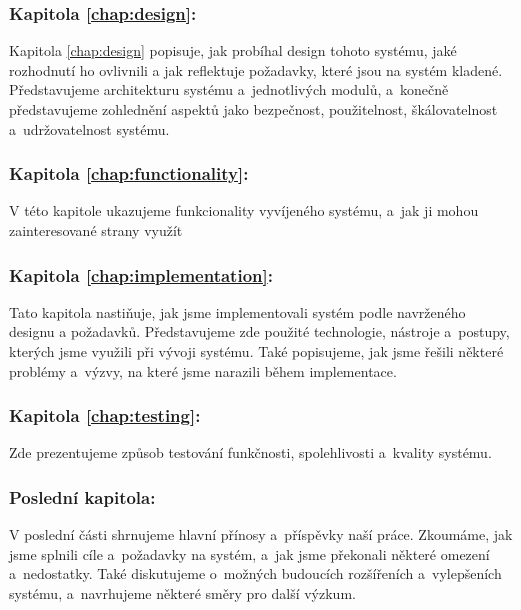 \subsubsection{Kapitola \ref{chap:design}: }
Kapitola \ref{chap:design} popisuje, jak probíhal design tohoto systému, jaké rozhodnutí ho ovlivnili a jak reflektuje požadavky, které jsou na systém kladené.
Představujeme architekturu systému a~jednotlivých modulů, a~konečně představujeme zohlednění aspektů jako bezpečnost, použitelnost, škálovatelnost a~udržovatelnost systému.

\subsubsection{Kapitola \ref{chap:functionality}: }
V této kapitole ukazujeme funkcionality vyvíjeného systému, a~jak ji mohou zainteresované strany využít

\subsubsection{Kapitola \ref{chap:implementation}: }
Tato kapitola nastiňuje, jak jsme implementovali systém podle navrženého designu a požadavků.
Představujeme zde použité technologie, nástroje a~postupy, kterých jsme využili při vývoji systému.
Také popisujeme, jak jsme řešili některé problémy a~výzvy, na které jsme narazili během implementace.

\subsubsection{Kapitola \ref{chap:testing}: }
Zde prezentujeme způsob testování funkčnosti, spolehlivosti a~kvality systému.

\subsubsection{Poslední kapitola: }
V poslední části shrnujeme hlavní přínosy a~příspěvky naší práce. Zkoumáme, jak jsme splnili cíle a~požadavky na systém, a~jak jsme překonali některé omezení a~nedostatky.
Také diskutujeme o~možných budoucích rozšířeních a~vylepšeních systému, a~navrhujeme některé směry pro další výzkum.